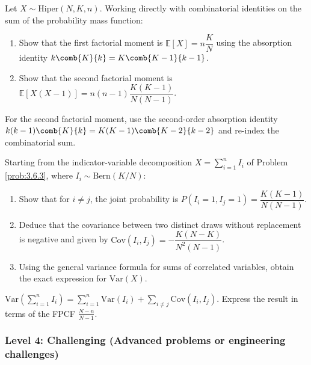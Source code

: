 \begin{problema}
	\label{prob:3.6.7}
	Let $X \sim \text{Hiper}(N, K, n)$. Working directly with combinatorial identities on the sum of the probability mass function:
	\begin{enumerate}
		\item Show that the first factorial moment is $\mathbb{E}[X] = n \dfrac{K}{N}$ using the absorption identity $k \comb{K}{k} = K \comb{K-1}{k-1}$.
		\item Show that the second factorial moment is $\mathbb{E}[X(X-1)] = n(n-1) \dfrac{K(K-1)}{N(N-1)}$.
	\end{enumerate}
\end{problema}

\begin{sugerencia}
	For the second factorial moment, use the second-order absorption identity $k(k-1)\comb{K}{k} = K(K-1)\comb{K-2}{k-2}$ and re-index the combinatorial sum.
\end{sugerencia}

\begin{problema}
	\label{prob:3.6.8}
	Starting from the indicator-variable decomposition $X = \sum_{i=1}^n I_i$ of Problem \ref{prob:3.6.3}, where $I_i \sim \text{Bern}(K/N)$:
	\begin{enumerate}
		\item Show that for $i \neq j$, the joint probability is $P(I_i = 1, I_j = 1) = \dfrac{K(K-1)}{N(N-1)}$.
		\item Deduce that the covariance between two distinct draws without replacement is negative and given by $\text{Cov}(I_i, I_j) = -\dfrac{K(N-K)}{N^2(N-1)}$.
		\item Using the general variance formula for sums of correlated variables, obtain the exact expression for $\text{Var}(X)$.
	\end{enumerate}
\end{problema}

\begin{sugerencia}
	$\text{Var}\left(\sum_{i=1}^n I_i\right) = \sum_{i=1}^n \text{Var}(I_i) + \sum_{i \neq j} \text{Cov}(I_i, I_j)$. Express the result in terms of the FPCF $\frac{N-n}{N-1}$.
\end{sugerencia}

\subsubsection*{Level 4: Challenging (Advanced problems or engineering challenges)}

